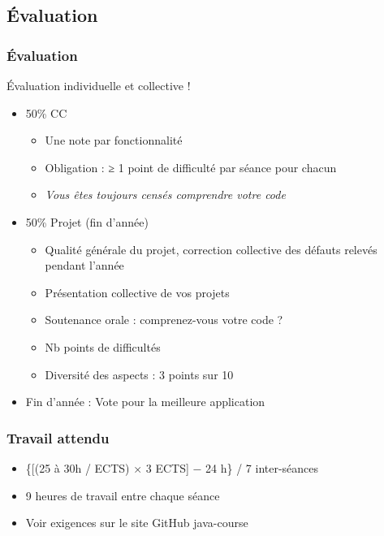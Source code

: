 \documentclass[english, french]{beamer}
\begin{document}
\subsection{Évaluation}
\begin{frame}
	\frametitle{Évaluation}
	 Évaluation individuelle et collective !
	\begin{itemize}
		\item 50\% CC
		\begin{itemize}
			\item Une note par fonctionnalité
			\item Obligation : ≥ 1 point de difficulté par séance pour chacun
			\item \emph{Vous êtes toujours censés comprendre votre code}
		\end{itemize}
		\item 50\% Projet (fin d’année)
		\begin{itemize}
			\item Qualité générale du projet, correction collective des défauts relevés pendant l’année
			\item Présentation collective de vos projets
			\item Soutenance orale : comprenez-vous votre code ?
			\item Nb points de difficultés
			\item Diversité des aspects : 3 points sur 10
		\end{itemize}
		\item Fin d’année : Vote pour la meilleure application
	\end{itemize}
\end{frame}

\begin{frame}
	\frametitle{Travail attendu}
	\begin{itemize}
		\item \{[(25 à 30h / ECTS) × 3 ECTS] − 24 h\} / 7 inter-séances
		\item 9 heures de travail entre chaque séance
		\item Voir exigences sur le site GitHub java-course
	\end{itemize}
\end{frame}
\end{document}
